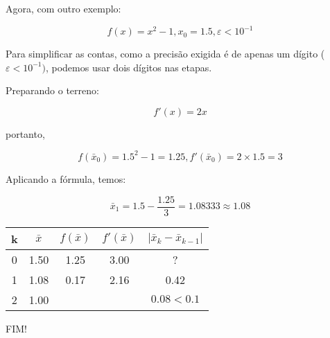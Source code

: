 \documentclass[a4paper]{article}
\begin{document}
Agora, com outro exemplo:

\begin{displaymath}
  f(x) = x^2 -1, x_0 = 1.5, \varepsilon <10^{-1}
\end{displaymath}

Para simplificar as contas, como a precisão exigida é de apenas um
dígito ($\varepsilon <10^{-1})$, podemos usar dois dígitos nas etapas.

Preparando o terreno:

\begin{displaymath}
  f'(x) = 2x
\end{displaymath}

portanto,

\begin{displaymath}
  f(\bar{x}_0) = 1.5^2-1 = 1.25, f'(\bar{x}_0) = 2 \times 1.5 = 3
\end{displaymath}

Aplicando a fórmula, temos:

\begin{displaymath}
  \bar{x}_1 = 1.5 - \frac{1.25}{3} = 1.08333 \approx 1.08
\end{displaymath}

\begin{center}
  \begin{tabular}{c|c|c|c|c}
    k & $\bar{x}$ & $f(\bar{x})$ & $f'(\bar{x})$ & $|\bar{x}_k - \bar{x}_{k-1}|$\\
    \hline
    0 & 1.50 & 1.25 & 3.00 & ? \\
    \hline
    1 & 1.08 & 0.17 & 2.16 & 0.42 \\
    \hline
    2 & 1.00 &  &  & $0.08 < 0.1$ \\
  \end{tabular}
\end{center}

FIM!
\end{document}
